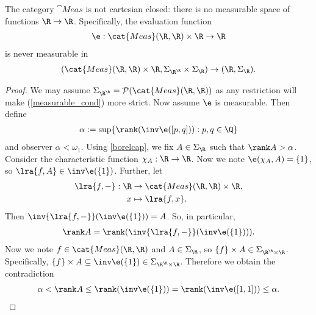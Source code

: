\documentclass{article}
\begin{document}
\begin{theorem}[Aumann, 1961]
	The category $\cat{Meas}$ is not cartesian closed: there is no measurable space of functions $\R\to\R$.	
	Specifically, the evaluation function 
	\begin{align*}
		\e : \cat{Meas}(\R,\R) \times \R \to \R
	\end{align*}
	is never measurable in 
	\begin{align*}
		(\cat{Meas}(\R,\R)\times\R,\Sigma_{\R^\R}\times \Sigma_\R) \to (\R, \Sigma_\R).
	\end{align*}
	\begin{proof}
		We may assume $\Sigma_{\R^\R}=\mathcal{P}(\cat{Meas}(\R,\R))$ as any restriction will make
		(\ref{measurable_cond}) more strict.
		Now assume $\e$ is measurable. Then define
		\begin{align*}
			\alpha := \sup\{\rank(\inv\e([p,q])):p,q\in\Q\}
		\end{align*}
		and observer $\alpha<\omega_1$.
		Using \ref{borelcap}, we fix $A\in \Sigma_\R$ such that $\rank A>\alpha$. 
		Consider the characteristic function $\chi_A:\R\to\R$. Now we note 
		$\e(\chi_A,A)=\{1\}$, so $\lra{f,A}\in\inv\e(\{1\})$. Further, let 
		\begin{align*}
			\lra{f,-}:\R&\to\cat{Meas}(\R,\R)\times\R,\\
			x&\mapsto \lra{f,x}.
		\end{align*}
		Then $\inv{\lra{f,-}}(\inv\e(\{1\}))=A$. So, in particular, 
		\begin{align*}
			\rank A = \rank(\inv{\lra{f,-}}(\inv\e(\{1\}))).
		\end{align*}
		Now we note $f\in\cat{Meas}(\R,\R)$ and $A\in \Sigma_\R$, so $\{f\}\times A\in \Sigma_{\R^\R\times\R}$.
		Specifically, $\{f\}\times A\subseteq\inv\e(\{1\})\in \Sigma_{\R^\R\times\R}$. Therefore 
		we obtain the contradiction
		\begin{align*}
			\alpha<\rank A \leq \rank(\inv\e(\{1\}))=\rank(\inv\e([1,1]))\leq \alpha.
		\end{align*}
	
	\end{proof}
\end{theorem}
\end{document}

